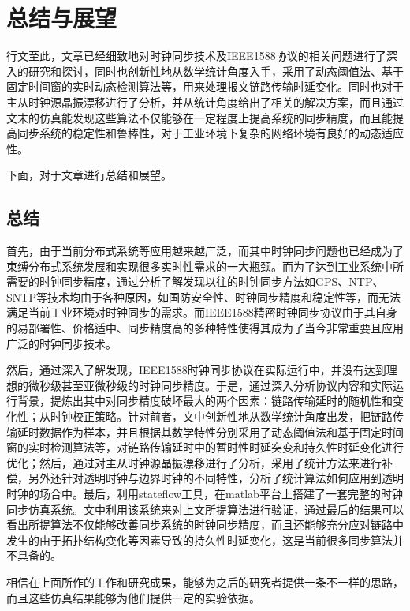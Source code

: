 
\chapter{总结与展望}
行文至此，文章已经细致地对时钟同步技术及IEEE1588协议的相关问题进行了深入的研究和探讨，同时也创新性地从数学统计角度入手，采用了动态阈值法、基于固定时间窗的实时动态检测算法等，用来处理报文链路传输时延变化。同时也对于主从时钟源晶振漂移进行了分析，并从统计角度给出了相关的解决方案，而且通过文末的仿真能发现这些算法不仅能够在一定程度上提高系统的同步精度，而且能提高同步系统的稳定性和鲁棒性，对于工业环境下复杂的网络环境有良好的动态适应性。

下面，对于文章进行总结和展望。

\section{总结}
首先，由于当前分布式系统等应用越来越广泛，而其中时钟同步问题也已经成为了束缚分布式系统发展和实现很多实时性需求的一大瓶颈。而为了达到工业系统中所需要的时钟同步精度，通过分析了解发现以往的时钟同步方法如GPS、NTP、SNTP等技术均由于各种原因，如国防安全性、时钟同步精度和稳定性等，而无法满足当前工业环境对时钟同步的需求。而IEEE1588精密时钟同步协议由于其自身的易部署性、价格适中、同步精度高的多种特性使得其成为了当今非常重要且应用广泛的时钟同步技术。

然后，通过深入了解发现，IEEE1588时钟同步协议在实际运行中，并没有达到理想的微秒级甚至亚微秒级的时钟同步精度。于是，通过深入分析协议内容和实际运行背景，提炼出其中对同步精度破坏最大的两个因素：链路传输延时的随机性和变化性；从时钟校正策略。针对前者，文中创新性地从数学统计角度出发，把链路传输延时数据作为样本，并且根据其数学特性分别采用了动态阈值法和基于固定时间窗的实时检测算法等，对链路传输延时中的暂时性时延突变和持久性时延变化进行优化；然后，通过对主从时钟源晶振漂移进行了分析，采用了统计方法来进行补偿，另外还针对透明时钟与边界时钟的不同特性，分析了统计算法如何应用到透明时钟的场合中。最后，利用stateflow工具，在matlab平台上搭建了一套完整的时钟同步仿真系统。文中利用该系统来对上文所提算法进行验证，通过最后的结果可以看出所提算法不仅能够改善同步系统的时钟同步精度，而且还能够充分应对链路中发生的由于拓扑结构变化等因素导致的持久性时延变化，这是当前很多同步算法并不具备的。

相信在上面所作的工作和研究成果，能够为之后的研究者提供一条不一样的思路，而且这些仿真结果能够为他们提供一定的实验依据。 

